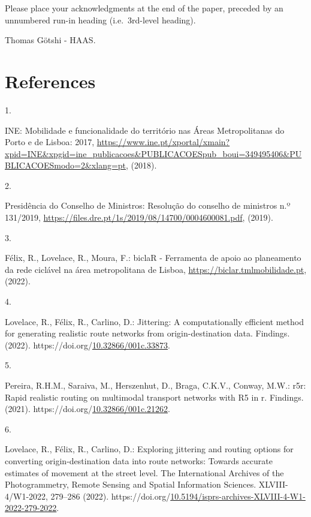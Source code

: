 \documentclass[runningheads]{llncs}
\newlength{\cslhangindent}
\newlength{\csllabelwidth}
\newlength{\cslentryspacingunit} %
\newenvironment{CSLReferences}[2] %
 {%
  \setlength{\parindent}{0pt}
  \ifodd #1
  \let\oldpar\par
  \def\par{\hangindent=\cslhangindent\oldpar}
  \fi
  \setlength{\parskip}{#2\cslentryspacingunit}
 }%
 {}
\newcommand{\CSLLeftMargin}[1]{\parbox[t]{\csllabelwidth}{#1}}
\newcommand{\CSLRightInline}[1]{\parbox[t]{\linewidth - \csllabelwidth}{#1}\break}
\begin{document}
Please place your acknowledgments at the end of the paper, preceded by
an unnumbered run-in heading (i.e.~3rd-level heading).

Thomas Götshi - HAAS.

\hypertarget{references}{%
\section*{References}\label{references}}

\hypertarget{refs}{}
\begin{CSLReferences}{0}{0}
\leavevmode{}%
\CSLLeftMargin{1. }%
\CSLRightInline{INE: Mobilidade e funcionalidade do território nas
{Áreas Metropolitanas do Porto e de Lisboa}: 2017,
\url{https://www.ine.pt/xportal/xmain?xpid=INE\&xpgid=ine_publicacoes\&PUBLICACOESpub_boui=349495406\&PUBLICACOESmodo=2\&xlang=pt},
(2018).}

\leavevmode{}%
\CSLLeftMargin{2. }%
\CSLRightInline{Presidência do Conselho de Ministros: Resolução do
conselho de ministros n.º 131/2019,
\url{https://files.dre.pt/1s/2019/08/14700/0004600081.pdf}, (2019).}

\leavevmode{}%
\CSLLeftMargin{3. }%
\CSLRightInline{Félix, R., Lovelace, R., Moura, F.: {biclaR - Ferramenta
de apoio ao planeamento da rede ciclável na área metropolitana de
Lisboa}, \url{https://biclar.tmlmobilidade.pt}, (2022).}

\leavevmode{}%
\CSLLeftMargin{4. }%
\CSLRightInline{Lovelace, R., Félix, R., Carlino, D.: Jittering: A
computationally efficient method for generating realistic route networks
from origin-destination data. Findings. (2022).
https://doi.org/\href{https://doi.org/10.32866/001c.33873}{10.32866/001c.33873}.}

\leavevmode{}%
\CSLLeftMargin{5. }%
\CSLRightInline{Pereira, R.H.M., Saraiva, M., Herszenhut, D., Braga,
C.K.V., Conway, M.W.: r5r: Rapid realistic routing on multimodal
transport networks with R5 in r. Findings. (2021).
https://doi.org/\href{https://doi.org/10.32866/001c.21262}{10.32866/001c.21262}.}

\leavevmode{}%
\CSLLeftMargin{6. }%
\CSLRightInline{Lovelace, R., Félix, R., Carlino, D.: Exploring
jittering and routing options for converting origin-destination data
into route networks: Towards accurate estimates of movement at the
street level. The International Archives of the Photogrammetry, Remote
Sensing and Spatial Information Sciences. XLVIII-4/W1-2022, 279--286
(2022).
https://doi.org/\href{https://doi.org/10.5194/isprs-archives-XLVIII-4-W1-2022-279-2022}{10.5194/isprs-archives-XLVIII-4-W1-2022-279-2022}.}

\end{CSLReferences}

%
\end{document}
